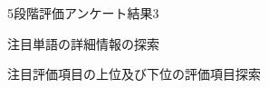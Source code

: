 \documentclass[syuuron]{kuee}
\begin{document}
		\begin{figure}
			\begin{center}
			\end{center}
			\caption{5段階評価アンケート結果3}
	  		\label{fig:res9}
		\end{figure}
		\begin{figure}
			\begin{center}
			\end{center}
			\caption{注目単語の詳細情報の探索}
	  		\label{fig:cas1}
		\end{figure}
		\begin{figure}
			\begin{center}
			\end{center}
			\caption{注目評価項目の上位及び下位の評価項目探索}
	  		\label{fig:cas2}
		\end{figure}
			
\end{document}
